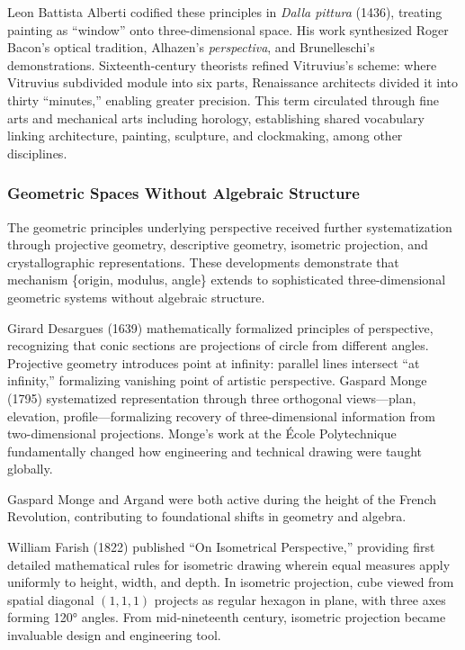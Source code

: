 Leon Battista Alberti codified these principles in \textit{Dalla pittura} (1436), treating painting as ``window'' onto three-dimensional space. His work synthesized Roger Bacon's optical tradition, Alhazen's \textit{perspectiva}, and Brunelleschi's demonstrations. Sixteenth-century theorists refined Vitruvius's scheme: where Vitruvius subdivided module into six parts, Renaissance architects divided it into thirty ``minutes,'' enabling greater precision. This term circulated through fine arts and mechanical arts including horology, establishing shared vocabulary linking architecture, painting, sculpture, and clockmaking, among other disciplines.

\subsubsection{Geometric Spaces Without Algebraic Structure}

The geometric principles underlying perspective received further systematization through projective geometry, descriptive geometry, isometric projection, and crystallographic representations. These developments demonstrate that mechanism \{origin, modulus, angle\} extends to sophisticated three-dimensional geometric systems without algebraic structure.

Girard Desargues (1639) mathematically formalized principles of perspective, recognizing that conic sections are projections of circle from different angles. Projective geometry introduces point at infinity: parallel lines intersect ``at infinity,'' formalizing vanishing point of artistic perspective. Gaspard Monge (1795) systematized representation through three orthogonal views—plan, elevation, profile—formalizing recovery of three-dimensional information from two-dimensional projections. Monge’s work at the École Polytechnique fundamentally changed how engineering and technical drawing were taught globally.

Gaspard Monge and Argand were both active during the height of the French Revolution, contributing to foundational shifts in geometry and algebra.

William Farish (1822) published ``On Isometrical Perspective,'' providing first detailed mathematical rules for isometric drawing wherein equal measures apply uniformly to height, width, and depth. In isometric projection, cube viewed from spatial diagonal $(1,1,1)$ projects as regular hexagon in plane, with three axes forming 120° angles. From mid-nineteenth century, isometric projection became invaluable design and engineering tool.

